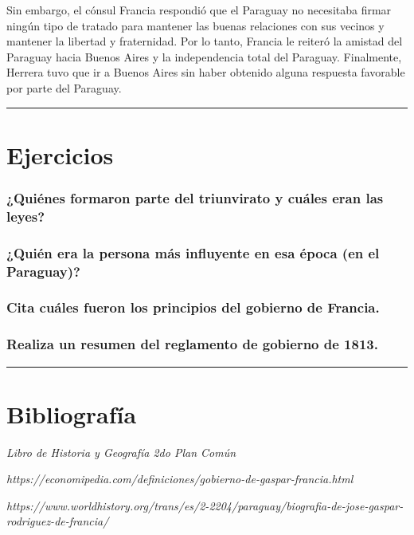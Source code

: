 \documentclass{article}
\begin{document}
Sin embargo, el cónsul Francia respondió que el Paraguay no necesitaba firmar ningún tipo
de tratado para mantener las buenas relaciones con sus vecinos y mantener la libertad 
y fraternidad. Por lo tanto, Francia le reiteró la amistad del Paraguay hacia Buenos Aires
y la independencia total del Paraguay. Finalmente, Herrera tuvo que ir a Buenos Aires
sin haber obtenido alguna respuesta favorable por parte del Paraguay.

      \pagebreak
      \hrule
      \vspace{9pt}
      \section*{Ejercicios}
      \subsubsection*{¿Quiénes formaron parte del triunvirato y cuáles eran las leyes?}
      \subsubsection*{¿Quién era la persona más influyente en esa época (en el Paraguay)?}
      \subsubsection*{Cita cuáles fueron los principios del gobierno de Francia.}
      \itemize{
      \item *\\
      \item *\\
      \item *\\
      \item *\\
      }
      \subsubsection*{Realiza un resumen del reglamento de gobierno de 1813.}

      \pagebreak
      \hrule
      \vspace{9pt}
      \section*{Bibliografía}
      \textit{Libro de Historia y Geografía 2do Plan Común}

      \textit{https://economipedia.com/definiciones/gobierno-de-gaspar-francia.html}

      \textit{https://www.worldhistory.org/trans/es/2-2204/paraguay/biografia-de-jose-gaspar-rodriguez-de-francia/}
  
\end{document}
